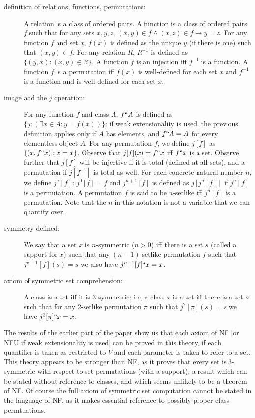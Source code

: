 \documentclass[12pt]{article}
\begin{document}
\begin{description}
\item[definition of relations, functions, permutations:]  A relation is a class of ordered pairs.   A function is a class of ordered pairs $f$ such that for any sets $x,y,z$, $(x,y) \in f \wedge (x,z) \in f \rightarrow y=z$.  For any function $f$ and set $x$, $f(x)$ is defined as the unique $y$ (if there is one) such that $(x,y) \in f$.   For any relation $R$, $R^{-1}$ is defined
as $\{(y,x) : (x,y) \in R\}$.   A function $f$ is an injection iff $f^{-1}$ is a function.   A function $f$ is a permutation iff $f(x)$ is well-defined for each set $x$ and $f^{-1}$ is a function and is well-defined for each set $x$.  

\item[image and the $j$ operation:]  For any function $f$ and class $A$, $f``A$ is defined as $\{y:(\exists x \in A:  y = f(x))\}$:  if weak extensionality is used, the previous definition applies only if $A$ has elements, and $f``A=A$ for every elementless object $A$.   For any permutation $f$, we define
$j[f]$ as $\{(x,f``x):x =x\}$.   Observe that $j[f](x) = f``x$ iff $f``x$ is a set.  Observe further that $j[f]$ will be injective if it is total (defined at all sets), and a permutation if $j[f^{-1}]$ is total as well.   For each concrete natural number $n$, we define $j^n[f]$:  $j^0[f]=f$ and $j^{n+1}[f]$ is defined as $j[j^n[f]]$ if $j^n[f]$ is a permutation.  A permutation $f$ is said to be $n$-setlike iff $j^n[f]$ is a permutation.  Note that  the $n$ in this notation is not a variable that we can quantify over.

\item[symmetry defined:]  We say that a set $x$ is $n$-symmetric ($n>0$)  iff there is a set $s$ (called a support for $x$) such that any $(n-1)$-setlike permutation $f$ such that $j^{n-1}[f](s)=s$
we also have $j^{n-1}[f]``x=x$.

\item[axiom of symmetric set comprehension:]  A class is a set iff it is 3-symmetric:  i.e, a class $x$ is a set iff there is a set $s$ such that for any 2-setlike permutation $\pi$ such that
$j^2[\pi](s)=s$ we have $j^2[\pi]``x=x$.

\end{description}

The results of the earlier part of the paper show us that each axiom of NF [or NFU if weak extensionality is used]  can be proved in this theory, if each quantifier is taken as restricted to $V$ and each parameter is taken to refer to a set.  This theory appears to be stronger than NF, as it proves that every set is 3-symmetric with respect to set permutations (with a support), a result which can be stated without reference to classes, and which seems unlikely to be a theorem of NF.  Of course the full axiom of symmetric set computation cannot be stated in the language of NF, as it makes essential reference to possibly proper class permtuations.
\end{document}
